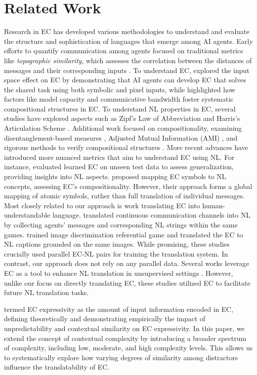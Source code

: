 \section{Related Work}
Research in EC has developed various methodologies to understand and evaluate the structure and sophistication of languages that emerge among AI agents. Early efforts to quantify communication among agents focused on traditional metrics like \textit{topographic similarity}, which assesses the correlation between the distances of messages and their corresponding inputs \cite{brighton2006understanding}. To understand EC, \citet{Lazaridou2018EmergenceOL} explored the input space effect on EC by demonstrating that AI agents can develop EC that solves the shared task using both symbolic and pixel inputs, while \citet{lee2018emergent} highlighted how factors like model capacity and communicative bandwidth foster systematic compositional structures in EC.
To understand NL properties in EC, several studies have explored aspects such as Zipf's Law of Abbreviation \cite{ueda2021relationship} and Harris's Articulation Scheme \cite{ueda2022word}. Additional work focused on compositionality, examining disentanglement-based measures \cite{Chaabouni2020CompositionalityAG}, Adjusted Mutual Information (AMI) \cite{mu2021emergent}, and rigorous methods to verify compositional structures \cite{Vani2021IteratedLF, andreas2019measuring}.
More recent advances have introduced more nuanced metrics that aim to understand EC using NL. For instance, \citet{NEURIPS2022_9f9ecbf4} evaluated learned EC on unseen test data to assess generalization, providing insights into NL aspects. \citet{carmeli2024concept} proposed mapping EC symbols to NL concepts, assessing EC's compositionality. However, their approach forms a global mapping of atomic symbols, rather than full translation of individual messages.  Most closely related to our approach is work translating EC into human-understandable language.  \citet{andreas_etal_2017_translating}  translated continuous communication channels into NL by collecting agents' messages and corresponding NL strings within the same games. \citet{yao2022linking} trained image discrimination referential game and translated the EC to NL captions grounded on the same images. While promising, these studies crucially used parallel EC-NL pairs for training the translation system. In contrast, our approach does not rely on any parallel data.
Several works leverage EC as a tool to enhance NL translation in unsupervised settings \cite{downey_etal_2023_learning, lee2018emergent}. However, unlike our focus on directly translating EC, these studies utilized EC to facilitate future NL translation tasks.

\citet{guo2021expressivity} termed EC expressivity as the amount of input information encoded in EC, defining theoretically and demonstrating empirically the impact of unpredictability and contextual similarity on EC expressivity. In this paper, we extend the concept of contextual complexity by introducing  a broader spectrum of complexity, including low, moderate, and high complexity levels. This allows us to systematically explore how varying degrees of similarity among distractors influence the translatability of EC.